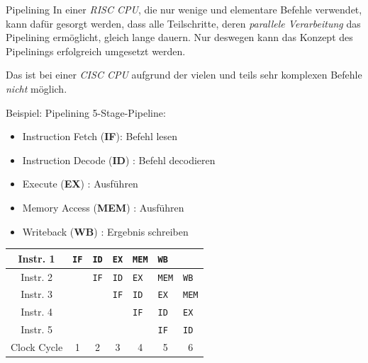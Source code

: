 \documentclass[german]{spicker}
\begin{document}
\begin{defi}{Pipelining}
    In einer \emph{RISC CPU}, die nur wenige und elementare Befehle verwendet, kann dafür
    gesorgt werden, dass alle Teilschritte, deren \emph{parallele Verarbeitung} das Pipelining
    ermöglicht, gleich lange dauern. Nur deswegen kann das Konzept des Pipelinings
    erfolgreich umgesetzt werden.

    Das ist bei einer \emph{CISC CPU} aufgrund der vielen
    und teils sehr komplexen Befehle \emph{nicht} möglich.
\end{defi}

\begin{bonus}{Beispiel: Pipelining}
    5-Stage-Pipeline:
    \begin{itemize}
        \item Instruction Fetch (\textbf{IF}): Befehl lesen
        \item Instruction Decode (\textbf{ID}) : Befehl decodieren
        \item Execute (\textbf{EX}) : Ausführen
        \item Memory Access (\textbf{MEM}) : Ausführen
        \item Writeback (\textbf{WB}) : Ergebnis schreiben
    \end{itemize}

    \begin{center}
        \begin{tabular}{| c || m{} | m{} | m{} | m{} | m{} | m{} |}
            \hline
            Instr. 1    & \texttt{IF}            & \texttt{ID}            & \texttt{EX}            & \texttt{MEM}           & \texttt{WB}            &                        \\
            \hline
            Instr. 2    &                        & \texttt{IF}            & \texttt{ID}            & \texttt{EX}            & \texttt{MEM}           & \texttt{WB}            \\
            \hline
            Instr. 3    &                        &                        & \texttt{IF}            & \texttt{ID}            & \texttt{EX}            & \texttt{MEM}           \\
            \hline
            Instr. 4    &                        &                        &                        & \texttt{IF}            & \texttt{ID}            & \texttt{EX}            \\
            \hline
            Instr. 5    &                        &                        &                        &                        & \texttt{IF}            & \texttt{ID}            \\
            \hline
            \hline
            Clock Cycle & \multicolumn{1}{c|}{1} & \multicolumn{1}{c|}{2} & \multicolumn{1}{c|}{3} & \multicolumn{1}{c|}{4} & \multicolumn{1}{c|}{5} & \multicolumn{1}{c|}{6} \\
            \hline
        \end{tabular}
    \end{center}
\end{bonus}
\end{document}
